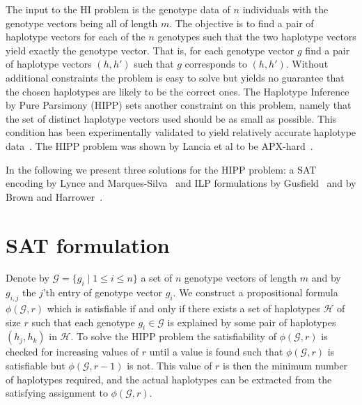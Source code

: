 \documentclass[12pt,a4paper]{article}
\begin{document}
The input to the HI problem is the genotype data of $n$ individuals with the genotype vectors being all of length $m$.
The objective is to find a pair of haplotype vectors for each of the $n$ genotypes such that the two haplotype vectors yield exactly the genotype vector.
That is, for each genotype vector $g$ find a pair of haplotype vectors $(h, h')$ such that $g$ corresponds to $(h, h')$.
Without additional constraints the problem is easy to solve but yields no guarantee that the chosen haplotypes are likely to be the correct ones.
The Haplotype Inference by Pure Parsimony (HIPP) sets another constraint on this problem, namely that the set of distinct haplotype vectors used should be as small as possible.
This condition has been experimentally validated to yield relatively accurate haplotype data~\cite{DBLP:journals/bioinformatics/WangX03a}.
The HIPP problem was shown by Lancia et al to be APX-hard~\cite{DBLP:journals/informs/LanciaPR04}.

In the following we present three solutions for the HIPP problem: a SAT encoding by Lynce and Marques-Silva~\cite{DBLP:conf/aaai/LynceM06} and ILP formulations by Gusfield~\cite{DBLP:conf/cpm/Gusfield03} and by Brown and Harrower~\cite{DBLP:journals/tcbb/BrownH06}.

\section{SAT formulation}
\label{sec:hipp-sat}
Denote by $\mathcal{G}=\{g_i\mid 1\leq i \leq n\}$ a set of $n$ genotype vectors of length $m$ and by $g_{i,j}$ the $j$'th entry of genotype vector $g_i$.
We construct a propositional formula $\phi (\mathcal{G}, r)$ which is satisfiable if and only if there exists a set of haplotypes $\mathcal{H}$ of size $r$ such that each genotype $g_i\in \mathcal{G}$ is explained by some pair of haplotypes $(h_j, h_k)$ in $\mathcal{H}$.
To solve the HIPP problem the satisfiability of $\phi (\mathcal{G}, r)$ is checked for increasing values of $r$ until a value is found such that $\phi (\mathcal{G}, r)$ is satisfiable but $\phi (\mathcal{G}, r-1)$ is not.
This value of $r$ is then the minimum number of haplotypes required, and the actual haplotypes can be extracted from the satisfying assignment to $\phi (\mathcal{G}, r)$.
\end{document}
